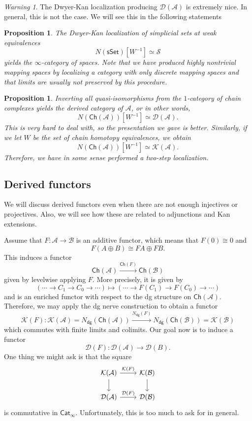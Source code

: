 \documentclass[10pt, oneside]{memoir}
\newtheorem{prop}[thm]{Proposition}
\theoremstyle{definition}
\theoremstyle{remark}
\newtheorem{warn}[thm]{Warning}
\theoremstyle{plain}
\theoremstyle{definition}
\theoremstyle{remark}
\newcommand{\mc}[1]{\mathcal{#1}}
\newcommand{\ms}[1]{\mathsf{#1}}
\newcommand{\1}{\mathbf{1}}
\newcommand{\2}{\mathbf{2}}
\newcommand{\3}{\mathbf{3}}
\begin{document}
\begin{warn}
    The Dwyer-Kan localization producing \(\mc{D}(\mc{A}) \) is extremely nice. In general, this is not the case. We will see this in the following statements
\end{warn}

\begin{prop}
    The Dwyer-Kan localization of simplicial sets at weak equivalences
    \[ N(\ms{sSet})[W^{-1}] \simeq \mc{S} \]
    yields the \(\infty \)-category of spaces. Note that we have produced highly nontrivial mapping spaces by localizing a category with only discrete mapping spaces and that limits are usually not preserved by this procedure.
\end{prop}

\begin{prop}
    Inverting all quasi-isomorphisms from the \(1 \)-category of chain complexes yields the derived category of \(\mc{A} \), or in other words,
    \[ N(\ms{Ch}(\mc{A}))[W^{-1}] \simeq \mc{D}(\mc{A}). \]
    This is very hard to deal with, so the presentation we gave is better. Similarly, if we let \(W \) be the set of chain homotopy equivalences, we obtain
    \[ N(\ms{Ch}(\mc{A}))[W^{-1}] \simeq \mc{K}(\mc{A}). \]
    Therefore, we have in some sense performed a two-step localization.
\end{prop}


\subsection{Derived functors}%
\label{sub:Derived functors}

We will discuss derived functors even when there are not enough injectives or projectives. Also, we will see how these are related to adjunctions and Kan extensions.

Assume that \(F \colon \mc{A} \to \mc{B} \) is an additive functor, which means that \(F(0) \cong 0 \) and
\[ F(A \oplus B) \cong FA \oplus FB. \]
This induces a functor
\[ \ms{Ch}(\mc{A}) \xrightarrow{\ms{Ch}(F)} \ms{Ch}(\mc{B}) \]
given by levelwise applying \(F \). More precisely, it is given by
\[ (\cdots \to C_1 \to C_0 \to \cdots) \mapsto (\cdots \to F(C_1) \to F(C_0) \to \cdots) \]
and is an enriched functor with respect to the dg structure on \(\ms{Ch}(\mc{A}) \). Therefore, we may apply the dg nerve construction to obtain a functor
\[ \mc{K}(F) \colon \mc{K}(\mc{A}) = N_{\ms{dg}}(\ms{Ch}(\mc{A})) \xrightarrow{N_{\ms{dg}}(F)} N_{\ms{dg}} (\ms{Ch}(\mc{B})) = \mc{K}(\mc{B}) \]
which commutes with finite limits and colimits. Our goal now is to induce a functor
\[ \mc{D}(F) \colon \mc{D}(\mc{A}) \to \mc{D}(B). \]
One thing we might ask is that the square
\begin{equation*}
\begin{tikzcd}
    \mc{K}(\mc{A}) \ar{r}{\mc{K}(F)} \ar{d} & \mc{K}(\mc{B}) \ar{d} \\
    \mc{D}(\mc{A}) \ar{r}{\mc{D}(F)} & \mc{D}(\mc{B})
\end{tikzcd}
\end{equation*}
is commutative in \(\ms{Cat}_{\infty} \). Unfortunately, this is too much to ask for in general.
\end{document}
